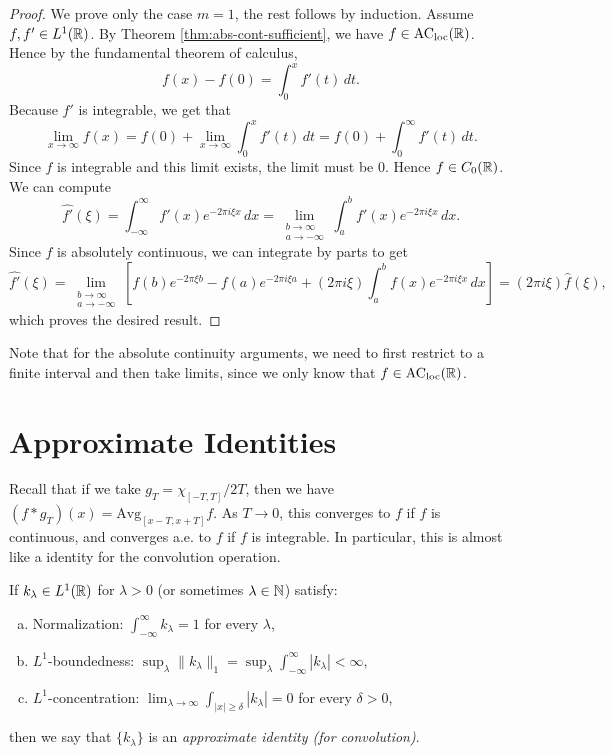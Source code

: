 \begin{proof}
  We prove only the case $m = 1$, the
  rest follows by induction. Assume
  $f, f' \in L^1(\mathbb{R})$. By Theorem
  \ref{thm:abs-cont-sufficient},
  we have $f \in \mathrm{AC}_{\mathrm{loc}}(\mathbb{R})$. Hence
  by the fundamental theorem of calculus,
  \[
    f(x) - f(0) = \int_0^x f'(t) \, dt.
  \]
  Because $f'$ is integrable, we get that
  \[
    \lim_{x \to \infty} f(x)
    =
    f(0) + \lim_{x \to \infty} \int_0^x f'(t)\, dt
    = f(0)  + \int_0^\infty f'(t) \, dt.
  \]
  Since $f$ is integrable and this limit
  exists, the limit must be $0$. Hence
  $f \in C_0(\mathbb{R})$. We can compute
  \[
    \widehat{f'}(\xi)
    = \int_{-\infty}^\infty f'(x) e^{-2\pi i \xi x} \, dx
    = \lim_{\substack{b \to \infty \\ a \to -\infty}} \int_a^b f'(x) e^{-2\pi i \xi x} \, dx.
  \]
  Since $f$ is absolutely continuous, we
  can integrate by parts to get
  \[
    \widehat{f'}(\xi)
    = \lim_{\substack{b \to \infty \\ a \to -\infty}}
    \left[f(b) e^{-2\pi \xi b} - f(a) e^{-2\pi i \xi a} + (2\pi i \xi)\int_a^b f(x) e^{-2\pi i \xi x}\, dx \right]
    = (2\pi i \xi) \widehat{f}(\xi),
  \]
  which proves the desired result.
\end{proof}

\begin{remark}
  Note that for the absolute continuity
  arguments, we need to first restrict
  to a finite interval and then
  take limits, since we only know that
  $f \in \mathrm{AC}_{\mathrm{loc}}(\mathbb{R})$.
\end{remark}

\section{Approximate Identities}

\begin{remark}
  Recall that if we take
  $g_T = \chi_{[-T, T]} / 2T$,
  then we have
  $(f * g_T)(x) = \mathrm{Avg}_{[x - T, x + T]} f$.
  As $T \to 0$, this converges to
  $f$ if $f$ is continuous, and converges
  a.e. to $f$ if $f$ is integrable. In
  particular, this is almost like
  a identity for the convolution operation.
\end{remark}

\begin{definition}
  If $k_\lambda \in L^1(\mathbb{R})$ for $\lambda > 0$ (or sometimes $\lambda \in \mathbb{N}$) satisfy:
  \begin{enumerate}[(a)]
    \item Normalization: $\displaystyle \int_{-\infty}^\infty k_{\lambda} = 1$ for every $\lambda$,
    \item $L^1$-boundedness:
      $\displaystyle \sup_{\lambda} \|k_\lambda\|_1 = \sup_{\lambda} \int_{-\infty}^\infty |k_\lambda| < \infty$,
    \item $L^1$-concentration:
      $\displaystyle \lim_{\lambda \to \infty} \int_{|x| \ge \delta} |k_\lambda| = 0$
      for every $\delta > 0$,
  \end{enumerate}
  then we say that $\{k_\lambda\}$ is
  an \emph{approximate identity (for
  convolution)}.
\end{definition}

